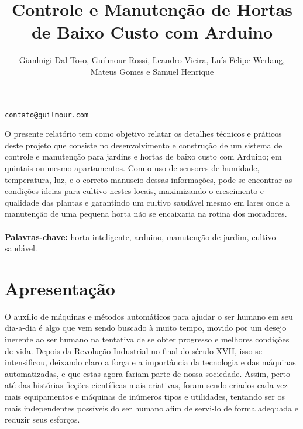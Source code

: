\documentclass[12pt]{article}
\title{Controle e Manutenção de Hortas de Baixo Custo com Arduino}
\author{Gianluigi Dal Toso, Guilmour Rossi, Leandro Vieira, Luís Felipe Werlang, \\Mateus Gomes e Samuel Henrique}
\begin{document}
 


\maketitle
\begin{center}
\texttt{contato@guilmour.com}
\end{center}

%
     
\begin{resumo} 
  O presente relatório tem como objetivo relatar os detalhes técnicos e práticos deste projeto que consiste no desenvolvimento e construção de um sistema de controle e manutenção para jardins e hortas de baixo custo com Arduino; em quintais ou mesmo apartamentos. Com o uso de sensores de humidade, temperatura, luz, e o correto manuseio dessas informações, pode-se encontrar as condições ideias para cultivo nestes locais, maximizando o crescimento e qualidade das plantas e garantindo um cultivo saudável mesmo em lares onde a manutenção de uma pequena horta não se encaixaria na rotina dos moradores.
  \textbf{\\\\Palavras-chave:} horta inteligente, arduino, manutenção de jardim, cultivo saudável.
\end{resumo}




\section{Apresentação}



O auxílio de máquinas e métodos automáticos para ajudar o ser humano em seu dia-a-dia é algo que vem sendo buscado à muito tempo, movido por um desejo inerente ao ser humano na tentativa de se obter progresso e melhores condições de vida. Depois da Revolução Industrial no final do século XVII, isso se intensificou, deixando claro a força e a importância da tecnologia e das máquinas automatizadas, e que estas agora fariam parte de nossa sociedade. Assim, perto até das histórias ficções-científicas mais criativas, foram sendo criados cada vez mais equipamentos e máquinas de inúmeros tipos e utilidades, tentando ser os mais independentes possíveis do ser humano afim de servi-lo de forma adequada e reduzir seus esforços. 
\end{document}
